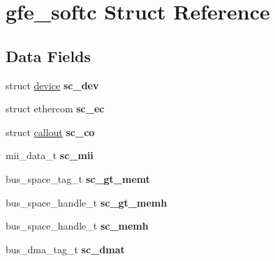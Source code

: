 \hypertarget{structgfe__softc}{}\section{gfe\+\_\+softc Struct Reference}
\label{structgfe__softc}
\subsection*{Data Fields}
\begin{DoxyCompactItemize}
\item 
\mbox{\label{structgfe__softc_aecf848e59c5f23733ff90416eb8f0aff}} 
struct \mbox{\hyperlink{structdevice}{device}} {\bfseries sc\+\_\+dev}
\item 
\mbox{\label{structgfe__softc_ad9a18f5a04b3f5b2b855b5c5ba06fbb7}} 
struct ethercom {\bfseries sc\+\_\+ec}
\item 
\mbox{\label{structgfe__softc_afd58c6355234096996189db203e33295}} 
struct \mbox{\hyperlink{structcallout}{callout}} {\bfseries sc\+\_\+co}
\item 
\mbox{\label{structgfe__softc_adfa09db3afff4bf4ade42baa16a9db59}} 
mii\+\_\+data\+\_\+t {\bfseries sc\+\_\+mii}
\item 
\mbox{\label{structgfe__softc_a62b4c57cc29ba5f3586388e3c966cb8c}} 
bus\+\_\+space\+\_\+tag\+\_\+t {\bfseries sc\+\_\+gt\+\_\+memt}
\item 
\mbox{\label{structgfe__softc_a6937770a07f2ef9295313c68ecc9d021}} 
bus\+\_\+space\+\_\+handle\+\_\+t {\bfseries sc\+\_\+gt\+\_\+memh}
\item 
\mbox{\label{structgfe__softc_afb1389e4af57f1248e87f86b540e012c}} 
bus\+\_\+space\+\_\+handle\+\_\+t {\bfseries sc\+\_\+memh}
\item 
\mbox{\label{structgfe__softc_afc7e74c3f511607fe183f23703864d44}} 
bus\+\_\+dma\+\_\+tag\+\_\+t {\bfseries sc\+\_\+dmat}
\item 
\mbox{\label{structgfe__softc_a494b6ba64396d8a720865562d3338a3e}} 

\end{DoxyCompactItemize}
